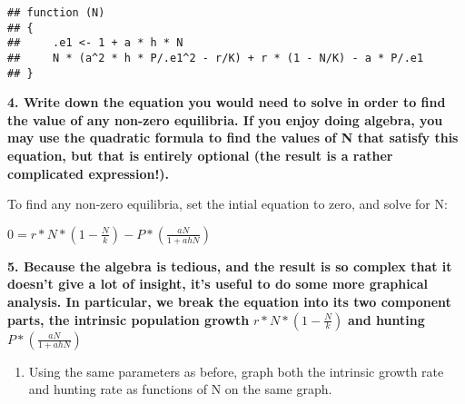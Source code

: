 \documentclass[]{article}
\providecommand{\tightlist}{%
  \setlength{\itemsep}{0pt}\setlength{\parskip}{0pt}}
\begin{document}
\begin{verbatim}
## function (N) 
## {
##     .e1 <- 1 + a * h * N
##     N * (a^2 * h * P/.e1^2 - r/K) + r * (1 - N/K) - a * P/.e1
## }
\end{verbatim}

\textbf{4. Write down the equation you would need to solve in order to
find the value of any non-zero equilibria. If you enjoy doing algebra,
you may use the quadratic formula to find the values of N that satisfy
this equation, but that is entirely optional (the result is a rather
complicated expression!).}

To find any non-zero equilibria, set the intial equation to zero, and
solve for N:

\(0 = r*N*(1-\frac{N}{k})-P*(\frac{aN}{1 + ahN})\)

\textbf{5. Because the algebra is tedious, and the result is so complex
that it doesn't give a lot of insight, it's useful to do some more
graphical analysis. In particular, we break the equation into its two
component parts, the intrinsic population growth}
\(r*N*(1-\frac{N}{k})\) \textbf{and hunting} \(P*(\frac{aN}{1 + ahN})\)

\begin{enumerate}
\def\labelenumi{\alph{enumi}.}
\tightlist
\item
  Using the same parameters as before, graph both the intrinsic growth
  rate and hunting rate as functions of N on the same graph.
\end{enumerate}
\end{document}
